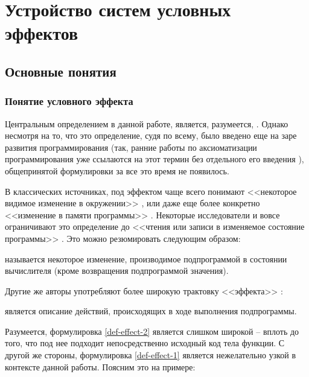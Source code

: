 \section{Устройство систем условных эффектов}

\subsection{Основные понятия}

\subsubsection{Понятие условного эффекта}

Центральным определением в данной работе, является, разумеется, . Однако несмотря на то, что это определение, судя по всему, было введено еще на заре развития программирования (так, ранние работы по аксиоматизации программирования уже ссылаются на этот термин без отдельного его введения \cite{Hoare69, Schwartz67}), общепринятой формулировки за все это время не появилось. 

В классических источниках, под эффектом чаще всего понимают <<некоторое видимое изменение в окружении>> \cite{Luc88}, или даже еще более конкретно <<изменение в памяти программы>> \cite{Vak09}. Некоторые исследователи и вовсе ограничивают это определение до <<чтения или записи в изменяемое состояние программы>> \cite{Green99}. Это можно резюмировать следующим образом:

\begin{definition}
    \label{def-effect-1}
     называется некоторое изменение, производимое подпрограммой в состоянии вычислителя (кроме возвращения подпрограммой значения).
\end{definition}

Другие же авторы употребляют более широкую трактовку <<эффекта>> \cite{Nielson99}: 

\begin{definition}
    \label{def-effect-2}
     является описание действий, происходящих в ходе выполнения подпрограммы.
\end{definition}

Разумеется, формулировка \ref{def-effect-2} является слишком широкой -- вплоть до того, что под нее подходит непосредственно исходный код тела функции. С другой же стороны, формулировка \ref{def-effect-1} является нежелательно узкой в контексте данной работы. Поясним это на примере:

